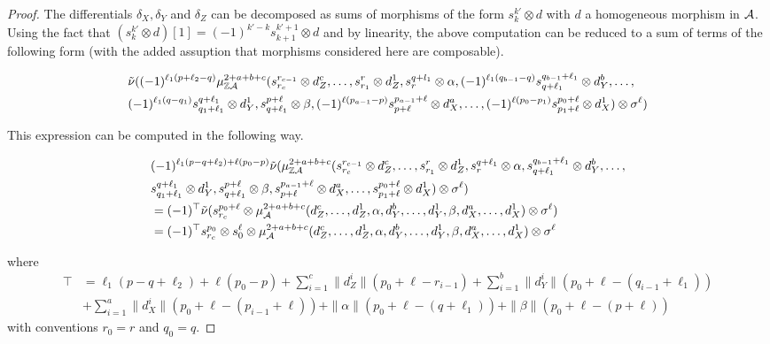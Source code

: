 \documentclass[12pt]{article}
\begin{document}
\begin{proof}
		The differentials $\delta_X, \delta_Y$ and $\delta_Z$ can be decomposed as sums of morphisms of the form $s^{k'}_k \otimes d$ with $d$ a homogeneous morphism in ${\cal{A}}$. Using the fact that $(s^{k'}_k \otimes d) [1] = (-1)^{k'-k} s^{k'+1}_{k+1} \otimes d$ and by linearity, the above computation can be reduced to a sum of terms of the following form (with the added assuption that morphisms considered here are composable).
		
		\begin{align*}
			&\tilde{\nu}((-1)^{\ell_1 (p+\ell_2-q)} \mu^{2+a+b+c}_{\mathbb{Z} {\cal{A}}}(s^{r_{c-1}}_{r_c} \otimes d_Z^{c},\dots,s^{r}_{r_1} \otimes d_Z^1, s^{q+l_1}_{r} \otimes \alpha, (-1)^{\ell_1(q_{b-1}-q)}s^{q_{b-1}+\ell_1}_{q+\ell_1} \otimes d_Y^b, \dots, \\
			&(-1)^{\ell_1(q - q_1)}s^{q+\ell_1}_{q_1+\ell_1} \otimes d_Y^1, s^{p+\ell}_{q+\ell_1} \otimes \beta, (-1)^{\ell(p_{a-1} - p)}s^{p_{a-1}+\ell}_{p+\ell} \otimes d_X^a, \dots, (-1)^{\ell(p_0 - p_1)}s^{p_0+\ell}_{p_1+\ell} \otimes d_X^1) \otimes \sigma^\ell) \\
		\end{align*}
		
		This expression can be computed in the following way.
		
		\begin{align*}
			& (-1)^{\ell_1(p-q + \ell_2) + \ell(p_0 - p)} \tilde{\nu}(\mu^{2+a+b+c}_{\mathbb{Z} {\cal{A}}}(s^{r_{c-1}}_{r_c} \otimes d_Z^{c},\dots,s^{r}_{r_1} \otimes d_Z^1, s^{q+\ell_1}_{r} \otimes \alpha,s^{q_{b-1}+\ell_1}_{q+\ell_1} \otimes d_Y^b, \dots,\\
			&s^{q+\ell_1}_{q_1 + \ell_1} \otimes d_Y^1, s^{p+\ell}_{q+\ell_1} \otimes \beta,s^{p_{a-1}+\ell}_{p+\ell} \otimes d_X^a, \dots,s^{p_0+\ell}_{p_1+\ell} \otimes d_X^1) \otimes \sigma^\ell) \\
			&= (-1)^{\top} \tilde{\nu} (s^{p_0+\ell}_{r_c} \otimes \mu_{\cal{A}}^{2 +a+b+c}(d_Z^c,\dots,d_Z^1,\alpha,d_Y^b,\dots,d_Y^1,\beta, d_X^a, \dots, d_X^1) \otimes \sigma^\ell) \\
			&= (-1)^{\top} s^{p_0}_{r_c} \otimes s^\ell_0 \otimes \mu_{\cal{A}}^{2 +a+b+c}(d_Z^c,\dots,d_Z^1,\alpha,d_Y^b,\dots,d_Y^1,\beta, d_X^a, \dots, d_X^1) \otimes \sigma^\ell
		\end{align*}
		
		\noindent where 
		\begin{align*}
			\top &= \ell_1(p-q + \ell_2) + \ell(p_0 - p) + \sum_{i=1}^{c} \| d_Z^i \| (p_0 +\ell - r_{i-1}) + \sum_{i=1}^{b} \| d_Y^i\|(p_0 + \ell -(q_{i-1} + \ell_1))\\
			& + \sum_{i=1}^{a} \| d_X^i \|(p_0 + \ell - (p_{i-1} + \ell)) + \|\alpha \|(p_0 + \ell - (q+\ell_1)) + \|\beta \|(p_0 + \ell - (p+\ell))
		\end{align*} 
		with conventions $r_0 = r$ and $q_0 = q$.
		

\end{proof}
\end{document}
